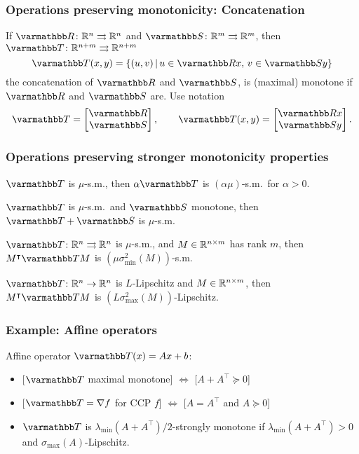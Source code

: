 \documentclass[10pt,mathserif]{beamer}
\begin{document}
\begin{frame}
\frametitle{Operations preserving monotonicity: Concatenation}
If $\opR \colon\reals^n\rightrightarrows \reals^n$ and $\opS \colon\reals^m\rightrightarrows \reals^m$,
then  $\opT \colon\reals^{n+m}\rightrightarrows\reals^{n+m}$
\[
\opT (x,y)=\{
(u,v)\,|\,
u\in \opR x,\,v\in \opS y
\}
\]
the concatenation of $\opR$ and $\opS$,
is (maximal) monotone if $\opR $ and $\opS $ are.
Use notation
\[
\opT =\begin{bmatrix}
\opR \\\opS
\end{bmatrix},
\qquad
\opT (x,y)=
\begin{bmatrix}
\opR x\\\opS y
\end{bmatrix}.
\]

\end{frame}



\begin{frame}
\frametitle{Operations preserving stronger monotonicity properties}
$\opT $ is $\mu$-s.m., then $\alpha\opT$ is $(\alpha \mu)$-s.m.\ for $\alpha >0$.
\vspace{0.2in}


$\opT $ is $\mu$-s.m.\ and $\opS $ monotone, then
$\opT +\opS $ is $\mu$-s.m.
\vspace{0.2in}

$\opT \colon\reals^n\rightrightarrows\reals^n$ is $\mu$-s.m., and $M\in \mathbb{R}^{n\times m}$ has rank $m$, then $M^\intercal\opT  M$ is
$(\mu\sigma^2_\mathrm{min}(M))$-s.m.
\vspace{0.2in}

$\opT  \colon\reals^n\rightarrow\reals^n$ is $L$-Lipschitz and $M\in \mathbb{R}^{n\times m}$, then $M^\intercal\opT  M$ is  $(L \sigma_\mathrm{max}^2(M))$-Lipschitz.

\end{frame}


\begin{frame}
\frametitle{Example: Affine operators}
Affine operator $\opT (x) =Ax+b$:
\begin{itemize}
\item

[$\opT$ maximal monotone] $\Leftrightarrow$ [$A+A^\intercal \succeq 0$]
\item

[$\opT=\nabla f$ for CCP $f$] $\Leftrightarrow$ [$A=A^\intercal$ and $A\succeq 0$]
\item
$\opT$ is $\lambda_\mathrm{min}(A+A^\intercal)/2$-strongly monotone if $\lambda_\mathrm{min}(A+A^\intercal)>0$ \\
and $\sigma_\mathrm{max}(A)$-Lipschitz.
\end{itemize}
\end{frame}
\end{document}
